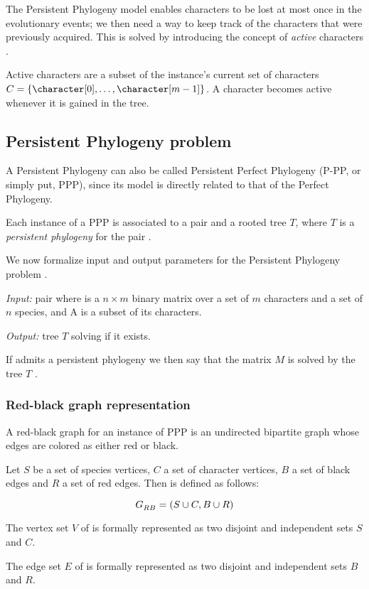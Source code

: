 The Persistent Phylogeny model enables characters to be lost at most once in the evolutionary events; we then need a way to keep track of the characters that were previously acquired.
This is solved by introducing the concept of \emph{active} characters \cite{PPPbin2012, PPPcgraph2016, PPPptime2016}.

Active characters are a subset of the instance's current set of characters $C = \{ \character[0], \dots, \character[m-1] \}$.
A character becomes active whenever it is gained in the tree.

\subsection{Persistent Phylogeny problem}\label{section:ppp}

A Persistent Phylogeny can also be called Persistent Perfect Phylogeny (P-PP, or simply put, PPP), since its model is directly related to that of the Perfect Phylogeny.

Each instance of a PPP is associated to a pair \ma{} and a rooted tree $T$, where $T$ is a \emph{persistent phylogeny} for the pair \ma{}.

We now formalize input and output parameters for the Persistent Phylogeny problem \cite{PPPptime2016}.

\begin{definition}\label{definition:ppp}
  \text{}

  \textit{Input:} pair \ma{} where \m{} is a $n \times m$ binary matrix over a set of $m$ characters and a set of $n$ species, and A is a subset of its characters.

  \textit{Output:} tree $T$ solving \m{} if it exists.
\end{definition}

If \ma{} admits a persistent phylogeny we then say that the matrix $M$ is solved by the tree $T$ \cite{PPPptime2016,PPPcgraph2016}.

\subsubsection{Red-black graph representation}\label{section:grb}

A red-black graph for an instance of PPP is an undirected bipartite graph whose edges are colored as either red or black.

\begin{definition}\label{definition:grb}
  Let $S$ be a set of species vertices, $C$ a set of character vertices, $B$ a set of black edges and $R$ a set of red edges.
  Then \grb{} is defined as follows:

  \[ G_{RB}^{}{} = (S \cup C, B \cup R) \]

  The vertex set $V$ of \grb{} is formally represented as two disjoint and independent sets $S$ and $C$.

  The edge set $E$ of \grb{} is formally represented as two disjoint and independent sets $B$ and $R$.
\end{definition}

